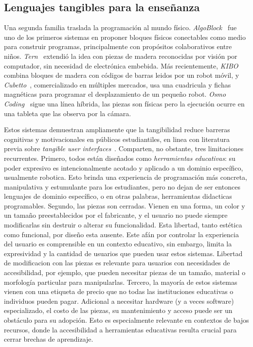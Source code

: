 \subsection{Lenguajes tangibles para la ense\~nanza}
\label{sec:related:tangible}

Una segunda familia traslada la programaci\'on al mundo f\'isico.
\emph{AlgoBlock}~\cite{suzuki95algoblock} fue uno de los primeros
sistemas en proponer bloques f\'isicos conectables como medio para
construir programas, principalmente con prop\'ositos colaborativos
entre ni\~nos. \emph{Tern}~\cite{horn07tern} extendi\'o la idea con piezas
de madera reconocidas por visi\'on por computador, sin necesidad de
electr\'onica embebida. M\'as recientemente, \emph{KIBO}~\cite{sullivan15kibo}
combina bloques de madera con c\'odigos de barras leidos por un robot
m\'ovil, y \emph{Cubetto}~\cite{cubetto}, comercializado en m\'ultiples
mercados, usa una cuadricula y fichas magn\'eticas para programar el
desplazamiento de un peque\~no robot. \emph{Osmo Coding}~\cite{osmo}
sigue una l\'inea h\'ibrida, las piezas son f\'isicas pero la ejecuci\'on
ocurre en una tableta que las observa por la c\'amara.

Estos sistemas demuestran ampliamente que la tangibilidad reduce
barreras cognitivas y motivacionales en p\'ublicos estudiantiles, en
linea con literatura previa sobre \emph{tangible user 
interfaces}~\cite{ishii97tangiblebits,marshall07tangible}. Comparten, 
no obstante, tres limitaciones recurrentes. Primero, todos est\'an 
dise\~nados como \emph{herramientas educativas}: su poder expresivo es 
intencionalmente acotado y aplicado a un dominio específico, usualmente robotica. 
Esto brinda una experiencia de programaci\'on m\'as concreta, manipulativa y estumulante 
para los estudiantes, pero no dejan de ser entonces lenguajes de dominio espec\'ifico, o en otras 
palabras, herramientas didacticas programables. Segundo, las piezas son cerradas. 
Vienen en una forma, un color y un tama\~no preestablecidos por el 
fabricante, y el usuario no puede siempre modificarlas sin destruir o alterar su 
funcionalidad. Esta libertad, tanto est\'etica como funcional, por dise\~no esta ausente.
Este af\'an por controlar la experiencia del usuario es comprensible en un contexto educativo, 
sin embargo, limita la expresividad y la cantidad de usuarios que pueden usar estos sistemas.
Libertad de modificacion con las piezas es relevante para usuarios con necesidades de
accesibilidad, por ejemplo, que pueden necesitar piezas de un tama\~no, material o morfolog\'ia
particular para manipularlas. Tercero, la mayor\'ia de estos sistemas vienen con una etiqueta de
precio que no todas las instituciones educativas o individuos pueden pagar. Adicional a necesitar
hardware (y a veces software) especializado, el costo de las piezas, su mantenimiento y acceso puede ser un
obst\'aculo para su adopci\'on. Esto es especialmente relevante en contextos de bajos recursos,
donde la accesibilidad a herramientas educativas resulta crucial para cerrar brechas de aprendizaje.

